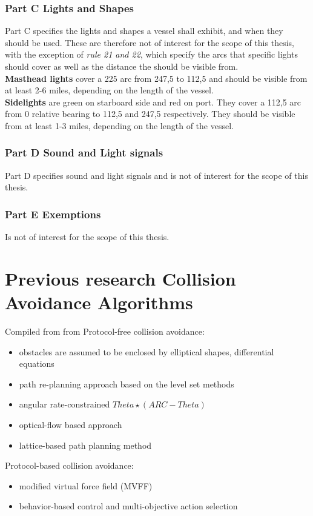\subsubsection{Part C Lights and Shapes}
Part C specifies the lights and shapes a vessel shall exhibit, and when they should be used. These are therefore not of interest for the scope of this thesis, with the exception of \textit{rule 21 and 22}, which specify the arcs that specific lights should cover as well as the distance the should be visible from.
\\
\textbf{Masthead lights} cover a 225 \textdegree arc from 247,5 \textdegree to 112,5 \textdegree and should be visible from at least 2-6 miles, depending on the length of the vessel.\\
\textbf{Sidelights} are green on starboard side and red on port. They cover a 112,5 arc from 0 relative bearing to 112,5 and 247,5 respectively. They should be visible from at least 1-3 miles, depending on the length of the vessel.
\subsubsection{Part D Sound and Light signals}
Part D specifies sound and light signals and is not of interest for the scope of this thesis.
\subsubsection{Part E Exemptions}
Is not of interest for the scope of this thesis.
\section{Previous research Collision Avoidance Algorithms}
Compiled from from \cite{liu2016unmanned}
Protocol-free collision avoidance:
\begin{itemize}
    \item obstacles are assumed to be enclosed by elliptical shapes, differential equations \cite{soltan2009trajectory}
    \item path re-planning approach based on the level set methods \cite{xu2013fast}
    \item angular rate-constrained $ Theta \star ( ARC − T heta ) $ \cite{kim2014angular}
    \item optical-flow based approach \cite{el2013visual}
    \item lattice-based path planning method \cite{bertaska2013experimental}
    
\end{itemize}
Protocol-based collision avoidance:
\begin{itemize}
    \item modified virtual force field (MVFF) \cite{lee2004fuzzy}
    \item behavior-based control and multi-objective action selection \cite{benjamin2004colregs}\cite{benjamin2006method}
\end{itemize}
 
